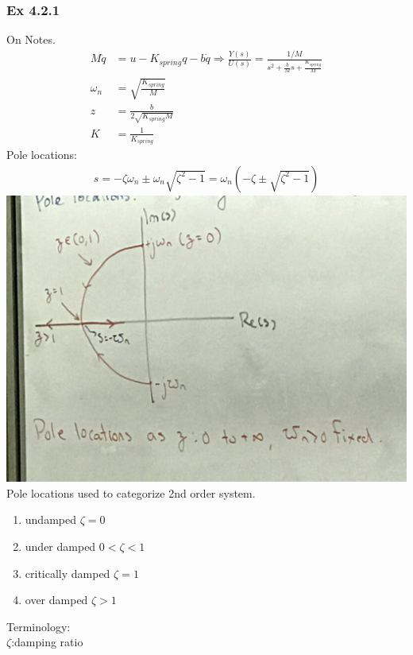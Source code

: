 \documentclass[letterpaper]{article}
\begin{document}
\subsubsection*{Ex 4.2.1}
On Notes.
\begin{align*}
	M\ddot q & =u-K_{spring}q-b\dot q\Rightarrow \frac{Y(s)}{U(s)}=\frac{1/M}{s^2+\frac{b}{M}s+\frac{K_{spring}}{M}} \\
	\omega_n & =\sqrt{\frac{K_{spring}}{M}}                                                                          \\
	z        & =\frac{b}{2\sqrt{K_{spring}M}}                                                                        \\
	K        & =\frac{1}{K_{spring}}                                                                                 
\end{align*}
Pole locations:
\begin{align*}
	s=-\zeta\omega_n\pm \omega_n\sqrt{\zeta^2-1}=\omega_n(-\zeta\pm \sqrt{\zeta^2-1}) 
\end{align*}
\includegraphics[scale=0.1]{images/4_2_POLE_LOCATION.jpg}\\
Pole locations used to categorize 2nd order system.
\begin{enumerate}
	\item undamped $\zeta=0$
	\item under damped $0<\zeta<1$
	\item critically damped $\zeta =1$
	\item over damped $\zeta>1$
\end{enumerate}
Terminology: \\
$\zeta$:damping ratio\\
\end{document}
